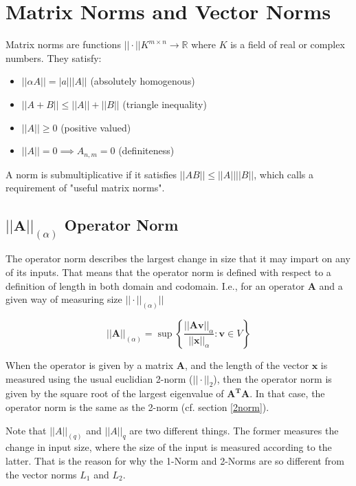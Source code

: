 \section{Matrix Norms and Vector Norms}

Matrix norms are functions $||\cdot|| K^{m\times n} \rightarrow \mathbb{R}$ where $K$ is a field of real or complex numbers. They satisfy:

\begin{itemize}
\item $||\alpha A|| = |a| ||A||$ (absolutely homogenous)
\item $||A+B|| \leq ||A|| + ||B||$ (triangle inequality)
\item $||A||\geq 0$ (positive valued)
\item $||A||=0 \implies A_{n,m}=0$ (definiteness)
\end{itemize}

A norm is submultiplicative if it satisfies $||AB||\leq||A||||B||$, which  calls a requirement of "useful matrix norms".



\subsection{$||\mathbf{A}||_{(\alpha)}$ Operator Norm}
The operator norm describes the largest change in size that it may impart on any of its inputs. That means that the operator norm is defined with respect to a definition of length in both domain and codomain. I.e., for an operator $\mathbf{A}$ and a given way of measuring size $||\cdot||_{(\alpha)}||$

\begin{equation}
||\mathbf{A}||_{(\alpha)} = \sup\left\{\frac{||\mathbf{A}\mathbf{v}||_{\alpha}}{||\mathbf{x}||_{\alpha}}: \mathbf{v} \in V\right\}
\end{equation}

When the operator is given by a matrix $\mathbf{A}$, and the length of the vector $\mathbf{x}$ is measured using the usual euclidian 2-norm ($||\cdot||_{2}$), then the operator norm is given by the square root of the largest eigenvalue of $\mathbf{A^T A}$. In that case, the operator norm is the same as the 2-norm (cf. section \ref{2norm}).

Note that $||A||_{(q)}$ and $||A||_q$ are two different things. The former measures the change in input size, where the size of the input is measured according to the latter. That is the reason for why the 1-Norm and 2-Norms are so different from the vector norms $L_1$ and $L_2$.



